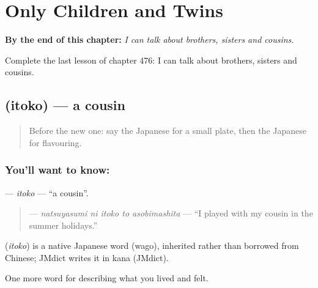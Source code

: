 
\chapter{Only Children and Twins}
\label{ch:ja-only-children-and-twins}

\begin{chapteropening}
\textbf{By the end of this chapter:} \emph{I can talk about brothers, sisters and cousins.}

Complete the last lesson of chapter 476: I can talk about brothers, sisters and cousins.
\end{chapteropening}

\section[\texorpdfstring{\ja{いとこ} (itoko)}{いとこ (itoko)}]{ (itoko) — a cousin}

\label{lesson:JA-C476-itoko}



\begin{quote}
Before the new one: say the Japanese for a small plate, then the Japanese for flavouring.
\end{quote}

\subsection*{You'll want to know: }
\textbf{} — \emph{itoko} — \textquotedblleft{}a cousin\textquotedblright{}.

\begin{quote}
\textbf{  } — \emph{natsuyasumi ni itoko to asobimashita} — \textquotedblleft{}I played with my cousin in the summer holidays.\textquotedblright{}
\end{quote}

\begin{cousinweb}
\textbf{} (\emph{itoko}) is a native Japanese word (wago), inherited rather than borrowed from Chinese; JMdict writes it in kana (JMdict).
\end{cousinweb}

\begin{grammarlens}[title={What you've built}]
One more word for describing what you lived and felt.
\end{grammarlens}

